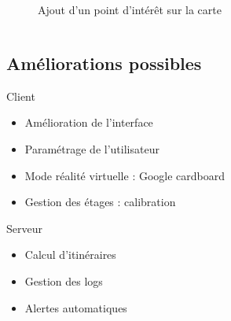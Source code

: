 \documentclass{beamer} %
\begin{document}
\begin{frame}[T]{\subsecname}
\begin{columns}[T]
\begin{column}{0.50\textwidth}
\begin{figure}
          \caption{Ajout d'un point d'intérêt sur la carte}
        \end{figure}
      \end{column}
    \end{columns}
  \end{frame}

  \subsection{Améliorations possibles}
  \begin{frame}{\subsecname}
    \begin{block}{Client}
      \begin{itemize}
        \item Amélioration de l'interface
        \item Paramétrage de l'utilisateur
        \item Mode réalité virtuelle : Google cardboard
        \item Gestion des étages : calibration
      \end{itemize}
    \end{block}

    \pause

    \begin{block}{Serveur}
    \begin{itemize}
      \item Calcul d'itinéraires
      \item Gestion des logs
      \item Alertes automatiques
    \end{itemize}
    \end{block}
    
  \end{frame}
  
\end{document}
